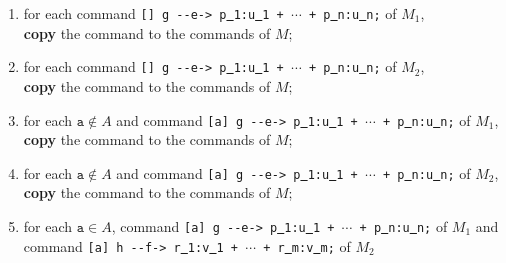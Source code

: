 \documentclass{article}
\newcommand{\arci}[1]{{-}{-}{#1}->}
\renewcommand{\_}{\underline{~}}
\newcommand{\code}[1]{\texttt{#1}}
\begin{document}
\begin{enumerate}
	\item for each command \code{[] g \arci{e} p\_1:u\_1 + $\cdots$ + p\_n:u\_n;} of $M_1$, \\ 
	\textbf{copy} the command to the commands of $M$;
	
	\item for each command \code{[] g \arci{e} p\_1:u\_1 + $\cdots$ + p\_n:u\_n;} of $M_2$, \\ 
	\textbf{copy} the command to the commands of $M$;

	\item for each $\code{a} \not\in A$ and command \code{[a] g \arci{e}  p\_1:u\_1 + $\cdots$ + p\_n:u\_n;} of $M_1$, \\ 
	\textbf{copy} the command to the commands of $M$;

	\item for each $\code{a} \not\in A$ and command \code{[a] g \arci{e}  p\_1:u\_1 + $\cdots$ + p\_n:u\_n;} of $M_2$, \\ 
	\textbf{copy} the command to the commands of $M$;


	\item for each $\code{a} \in A$, command \code{[a] g \arci{e} p\_1:u\_1 + $\cdots$ + p\_n:u\_n;} of $M_1$ and \\command \code{[a]  h \arci{f} r\_1:v\_1 + $\cdots$ + r\_m:v\_m;} of $M_2$ 
	\begin{itemize}
		

\end{itemize}
\end{enumerate}
\end{document}
